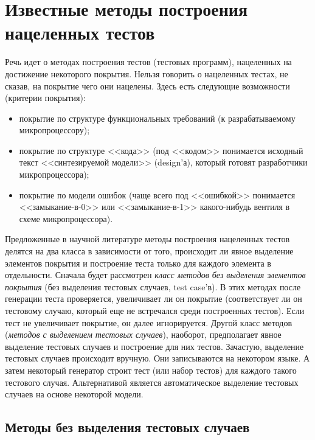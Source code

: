 \documentclass[14pt]{extreport}
\begin{document}
\chapter{Известные методы построения нацеленных тестов}

Речь идет о методах построения тестов (тестовых программ), нацеленных на достижение некоторого покрытия. Нельзя говорить о нацеленных тестах, не сказав, на покрытие чего они нацелены. Здесь есть следующие возможности (критерии покрытия):
\begin{itemize}
	\item покрытие по структуре функциональных требований (к разрабатываемому микропроцессору);
	\item покрытие по структуре <<кода>> (под <<кодом>> понимается исходный текст <<синтезируемой модели>> (design'а), который готовят разработчики микропроцессора);
	\item покрытие по модели ошибок (чаще всего под <<ошибкой>> понимается <<замыкание-в-0>> или <<замыкание-в-1>> какого-нибудь вентиля в схеме микропроцессора).
\end{itemize}

Предложенные в научной литературе методы построения нацеленных тестов делятся на два класса в зависимости от того, происходит ли явное выделение элементов покрытия и построение теста только для каждого элемента в отдельности. Сначала будет рассмотрен \emph{класс методов без выделения элементов покрытия} (без выделения тестовых случаев, test case'в). В этих методах после генерации теста проверяется, увеличивает ли он покрытие (соответствует ли он тестовому случаю, который еще не встречался среди построенных тестов). Если тест не увеличивает покрытие, он далее игнорируется. Другой класс методов (\emph{методов с выделением тестовых случаев}), наоборот, предполагает явное выделение тестовых случаев и построение для них тестов. Зачастую, выделение тестовых случаев происходит вручную. Они записываются на некотором языке. А затем некоторый генератор строит тест (или набор тестов) для каждого такого тестового случая. Альтернативой является автоматическое выделение тестовых случаев на основе некоторой модели.

\section{Методы без выделения тестовых случаев}
\end{document}
